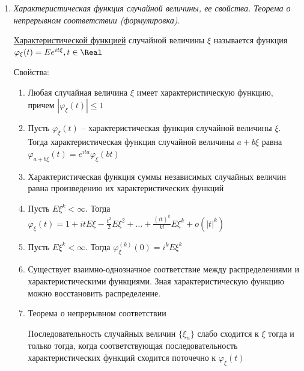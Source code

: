 \begin{enumerate}
\begin{enumerate}
\begin{enumerate}
            \item Если $r_{\xi,\eta} = -1$, то $\eta = a\xi + b$ и $a < 0$ (обратная линейная зависимость)
        \end{enumerate}
    \end{enumerate}

    Если $r_{\xi,\eta} \neq 0$, то говорят, что случайные величины коррелированы друг с другом. Если $r_{\xi,\eta} > 0$, 
    то имеет прямая корреляция, если $r_{\xi,\eta} < 0$ -- обратная

    \item \textit{Характеристическая функция случайной величины, ее свойства. Теорема о непрерывном соответствии (формулировка).}

    \hyperlink{characteristicfunction}{Характеристической функцией} случайной величины $\xi$ называется функция $\varphi_\xi(t) = Ee^{it\xi}, t \in \Real$
    
    Свойства:

    \begin{enumerate}
        \item Любая случайная величина $\xi$ имеет характеристическую функцию, причем $|\varphi_\xi(t)| \leq 1$

        \item Пусть $\varphi_\xi(t)$ -- характеристическая функция случайной величины $\xi$. Тогда характеристическая функция
        случайной величины $a + b\xi$ равна $\varphi_{a + b\xi}(t) = e^{ita} \varphi_{\xi}(bt)$

        \item Характеристическая функция суммы независимых случайных величин равна произведению их характеристических функций

        \item Пусть $E\xi^k < \infty$. Тогда $\varphi_\xi(t) = 1 + it E\xi - \frac{t^2}{2}E\xi^2 + \dots + \frac{(it)^k}{k!} E\xi^k + o(|t|^k)$

        \item Пусть $E\xi^k < \infty$. Тогда $\varphi_\xi^{(k)}(0) = i^k E\xi^k$

        \item Существует взаимно-однозначное соответствие между распределениями и характеристическими функциями.
        Зная характеристическую функцию можно восстановить распределение.

        \item Теорема о непрерывном соответствии
        
        \Ths Последовательность случайных величин $\{\xi_n\}$ слабо сходится к $\xi$ тогда и только тогда, когда
            соответствующая последовательность характеристических функций сходится поточечно к $\varphi_\xi(t)$


\end{enumerate}
\end{enumerate}
